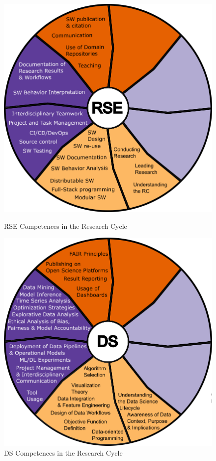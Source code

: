 \documentclass[
        english,biblatex
    ]{lni}
\begin{document}
    \begin{figure}[htbp]
    \centering
    \begin{minipage}{0.48\textwidth}
    \centering
    \includegraphics[width=\linewidth]{img/RC_RSE.png}
    \caption{RSE Competences in the Research Cycle}
    \label{fig:rc_rse}
    \end{minipage}\hfill
    \begin{minipage}{0.48\textwidth}
    \centering
    \includegraphics[width=\linewidth]{img/RC_DS.png}
    \caption{DS Competences in the Research Cycle}
    \label{fig:rc_ds}
    \end{minipage}
    \end{figure}
\end{document}

